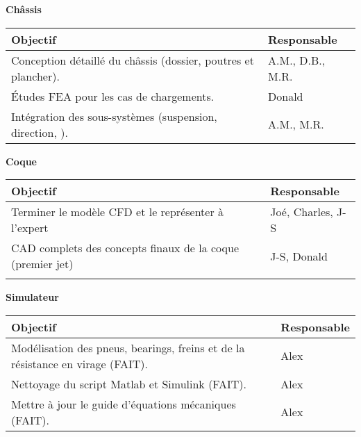 \textbf{\large Ch\^assis}\\
\begin{tabularx}{\linewidth}{
    |>{\hsize=1.75\hsize}X|%
    >{\hsize=0.25\hsize}X|%
  }
    \hline
    \textbf{Objectif} & \textbf{Responsable} \\\hline
       Conception détaillé du ch\^assis (dossier, poutres et plancher). & A.M., D.B., M.R.\\\hline 
       Études FEA pour les cas de chargements. & Donald\\\hline
       Intégration des sous-systèmes (suspension, direction, ). & A.M., M.R. \\\hline 
\end{tabularx}



\hfill \break
\textbf{\large Coque}\\
\begin{tabularx}{\linewidth}{
    |>{\hsize=1.75\hsize}X|%
    >{\hsize=0.25\hsize}X|%
  }
    \hline
    \textbf{Objectif} & \textbf{Responsable} \\\hline
       Terminer le modèle CFD et le représenter à l'expert & Joé, Charles, J-S \\\hline
       CAD complets des concepts finaux de la coque (premier jet) & J-S, Donald \\\hline
       & \\\hline 
\end{tabularx}



\hfill \break
\textbf{\large Simulateur}\\
\begin{tabularx}{\linewidth}{
    |>{\hsize=1.75\hsize}X|%
    >{\hsize=0.25\hsize}X|%
  }
    \hline
    \textbf{Objectif} & \textbf{Responsable} \\\hline
       Modélisation des pneus, bearings, freins et de la résistance en virage (FAIT).&Alex \\\hline 
       Nettoyage du script Matlab et Simulink (FAIT).&Alex \\\hline
       Mettre à jour le guide d'équations mécaniques (FAIT).&Alex \\\hline 
\end{tabularx}



